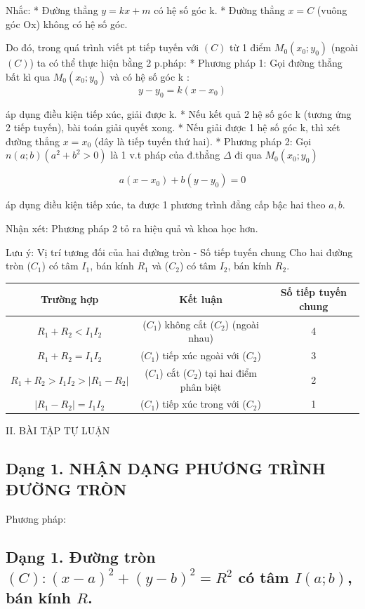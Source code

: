 \documentclass[12pt,a4paper]{book}
\begin{document}
Nhắc:
* Đường thẳng $y = kx + m$ có hệ số góc k.
* Đường thẳng $x = C$ (vuông góc Ox) không có hệ số góc.

Do đó, trong quá trình viết pt tiếp tuyến với $(C)$ từ 1 điểm $M_0(x_0; y_0)$ (ngoài $(C)$) ta có thể thực hiện bằng 2 p.pháp:
* Phương pháp 1: Gọi đường thẳng bất kì qua $M_0(x_0; y_0)$ và có hệ số góc k :
\[
y - y_0 = k(x - x_0)
\]



áp dụng điều kiện tiếp xúc, giải được k.
* Nếu kết quả 2 hệ số góc k (tương ứng 2 tiếp tuyến), bài toán giải quyết xong.
* Nếu giải được 1 hệ số góc k, thì xét đường thẳng $x = x_0$ (dây là tiếp tuyến thứ hai).
* Phương pháp 2: Gọi $n(a;b) \left( a^2 + b^2 > 0 \right)$ là 1 v.t pháp của đ.thẳng $\Delta$ đi qua $M_0(x_0; y_0)$

\[
a(x - x_0) + b(y - y_0) = 0
\]

áp dụng điều kiện tiếp xúc, ta được 1 phương trình đẳng cấp bậc hai theo $a, b$.

Nhận xét: Phương pháp 2 tỏ ra hiệu quả và khoa học hơn.

Lưu ý: Vị trí tương đối của hai đường tròn - Số tiếp tuyến chung
Cho hai đường tròn ($C_1$) có tâm $I_1$, bán kính $R_1$ và ($C_2$) có tâm $I_2$, bán kính $R_2$.

\begin{tabular}{|c|c|c|}
\hline
Trường hợp & Kết luận & Số tiếp tuyến chung \\
\hline
$R_1 + R_2 < I_1I_2$ & ($C_1$) không cắt ($C_2$) (ngoài nhau) & 4 \\
\hline
$R_1 + R_2 = I_1I_2$ & ($C_1$) tiếp xúc ngoài với ($C_2$) & 3 \\
\hline
$R_1 + R_2 > I_1I_2 > |R_1 - R_2|$ & ($C_1$) cắt ($C_2$) tại hai điểm phân biệt & 2 \\
\hline
$|R_1 - R_2| = I_1I_2$ & ($C_1$) tiếp xúc trong với ($C_2$) & 1 \\
\hline
\end{tabular}



II. BÀI TẬP TỰ LUẬN

\subsection{Dạng 1. NHẬN DẠNG PHƯƠNG TRÌNH ĐƯỜNG TRÒN}

Phương pháp:

\subsection{Dạng 1. Đường tròn $(C): (x-a)^2 + (y-b)^2 = R^2$ có tâm $I(a;b)$, bán kính $R$.}
\end{document}
